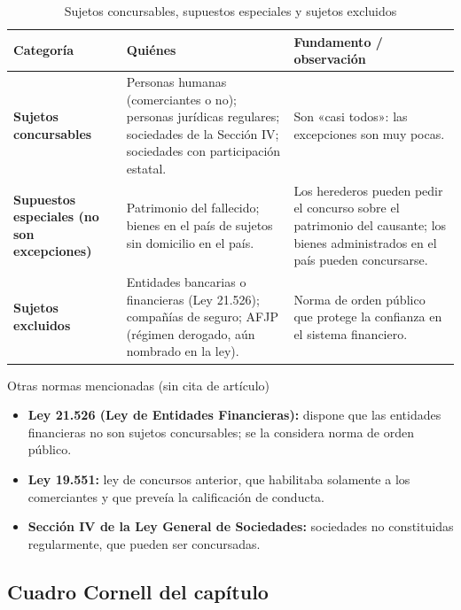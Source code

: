 \documentclass[12pt,oneside]{book}
\begin{document}
\begin{table}[H]
\centering
\caption{Sujetos concursables, supuestos especiales y sujetos excluidos}
\begin{tabularx}{\textwidth}{>{\raggedright\arraybackslash}p{}>{\raggedright\arraybackslash}X>{\raggedright\arraybackslash}X}
\toprule
\textbf{Categoría} & \textbf{Quiénes} & \textbf{Fundamento / observación} \\
\midrule
\textbf{Sujetos concursables} & Personas humanas (comerciantes o no); personas jurídicas regulares; sociedades de la Sección IV; sociedades con participación estatal. & Son «casi todos»: las excepciones son muy pocas. \\
\textbf{Supuestos especiales (no son excepciones)} & Patrimonio del fallecido; bienes en el país de sujetos sin domicilio en el país. & Los herederos pueden pedir el concurso sobre el patrimonio del causante; los bienes administrados en el país pueden concursarse. \\
\textbf{Sujetos excluidos} & Entidades bancarias o financieras (Ley 21.526); compañías de seguro; AFJP (régimen derogado, aún nombrado en la ley). & Norma de orden público que protege la confianza en el sistema financiero. \\
\bottomrule
\end{tabularx}
\end{table}

\begin{norma}{Otras normas mencionadas (sin cita de artículo)}
\begin{itemize}
    \item \textbf{Ley 21.526 (Ley de Entidades Financieras):} dispone que las entidades financieras no son sujetos concursables; se la considera norma de orden público.
    \item \textbf{Ley 19.551:} ley de concursos anterior, que habilitaba solamente a los comerciantes y que preveía la calificación de conducta.
    \item \textbf{Sección IV de la Ley General de Sociedades:} sociedades no constituidas regularmente, que pueden ser concursadas.
\end{itemize}
\end{norma}

\subsection*{Cuadro Cornell del capítulo}
\end{document}
